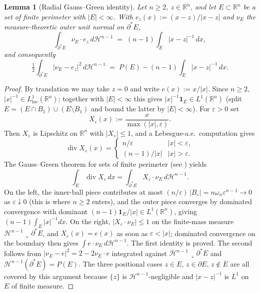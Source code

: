 \documentclass[11pt]{amsart}
\newtheorem{lemma}[theorem]{Lemma}
\theoremstyle{definition}
\newcommand{\R}{\mathbb R}
\newcommand{\Hn}{\mathcal H^{n-1}}
\newcommand{\Per}{P}
\begin{document}
\begin{lemma}[Radial Gauss--Green identity]\label{lem:radial-GG}
Let \(n\ge2\), \(z\in\R^n\), and let \(E\subset\R^n\) be a set of finite
perimeter with \(|E|<\infty\).  With \(e_z(x):=(x-z)/|x-z|\) and \(\nu_E\) the
measure-theoretic outer unit normal on \(\partial^*E\),
\[
   \int_{\partial^*E}\nu_E\cdot e_z\,d\Hn
   \;=\;(n-1)\!\int_E |x-z|^{-1}\,dx,
\]
and consequently
\[
   \tfrac12\!\int_{\partial^*E}|\nu_E-e_z|^2\,d\Hn
   \;=\;\Per(E)-(n-1)\!\int_E|x-z|^{-1}\,dx.
\]
\end{lemma}

\begin{proof}
By translation we may take \(z=0\) and write \(e(x):=x/|x|\).  Since \(n\ge2\),
\(|x|^{-1}\in L^1_{\mathrm{loc}}(\R^n)\); together with \(|E|<\infty\) this
gives \(|x|^{-1}\mathbf 1_E\in L^1(\R^n)\) (split \(E=(E\cap B_1)\cup(E\setminus
B_1)\) and bound the latter by \(|E|<\infty\)).  For \(\varepsilon>0\) set
\[
   X_\varepsilon(x):=\frac{x}{\max(|x|,\varepsilon)} .
\]
Then \(X_\varepsilon\) is Lipschitz on \(\R^n\) with \(|X_\varepsilon|\le1\), and
a Lebesgue-a.e.\ computation gives
\[
   \operatorname{div}X_\varepsilon(x)
   =\begin{cases} n/\varepsilon & |x|<\varepsilon,\\
                  (n-1)/|x| & |x|>\varepsilon.\end{cases}
\]
The Gauss--Green theorem for sets of finite perimeter (see
\cite[Thm.~15.9]{Maggi2012}) yields
\[
   \int_E \operatorname{div}X_\varepsilon\,dx
   = \int_{\partial^*E} X_\varepsilon\cdot \nu_E\,d\Hn.
\]
On the left, the inner-ball piece contributes at most
\((n/\varepsilon)\,|B_\varepsilon|=n\omega_n\varepsilon^{n-1}\to0\) as
\(\varepsilon\downarrow0\) (this is where \(n\ge2\) enters), and the outer piece
converges by dominated convergence with dominant \((n-1)\mathbf 1_E/|x|\in
L^1(\R^n)\), giving \((n-1)\int_E|x|^{-1}dx\).  On the right,
\(|X_\varepsilon\cdot\nu_E|\le1\) on the finite-mass measure
\(\Hn\,\llcorner\partial^*E\), and \(X_\varepsilon(x)=e(x)\) as soon as
\(\varepsilon<|x|\); dominated convergence on the boundary then gives
\(\int e\cdot\nu_E\,d\Hn\).  The first identity is proved.  The second follows
from \(|\nu_E-e|^2=2-2\nu_E\cdot e\) integrated against \(\Hn\,\llcorner\partial^*E\)
and \(\Hn(\partial^*E)=\Per(E)\).  The three positional cases \(z\in E\),
\(z\in\partial E\), \(z\notin\overline E\) are all covered by this argument
because \(\{z\}\) is \(\Hn\)-negligible and \(|x-z|^{-1}\) is \(L^1\) on \(E\) of
finite measure.
\end{proof}
\end{document}
